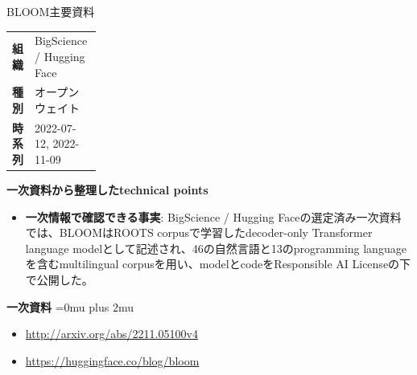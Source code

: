 \begin{technicalnote}{BLOOM}{主要資料}
\begingroup
\begin{tabularx}{\linewidth}{@{}>{\bfseries}p{0.22\linewidth}X@{}}
組織 & BigScience / Hugging Face \\
種別 & オープンウェイト \\
時系列 & 2022-07-12, 2022-11-09 \\
\end{tabularx}
\smallskip
{\bfseries 一次資料から整理したtechnical points}
\begin{itemize}[leftmargin=1.5em,itemsep=0.35em]
\item \textbf{一次情報で確認できる事実}: BigScience / Hugging Faceの選定済み一次資料では、BLOOMはROOTS corpusで学習したdecoder-only Transformer language modelとして記述され、46の自然言語と13のprogramming languageを含むmultilingual corpusを用い、modelとcodeをResponsible AI Licenseの下で公開した。
\end{itemize}
\begin{minipage}{\linewidth}
\begin{samepage}
{\bfseries 一次資料}
\begingroup\sloppy
\Urlmuskip=0mu plus 2mu\relax
\begin{itemize}[leftmargin=1.5em,itemsep=0.25em]
\item {\scriptsize\url{http://arxiv.org/abs/2211.05100v4}}
\item {\scriptsize\url{https://huggingface.co/blog/bloom}}
\end{itemize}
\endgroup
\end{samepage}
\end{minipage}
\endgroup
\end{technicalnote}
\medskip

